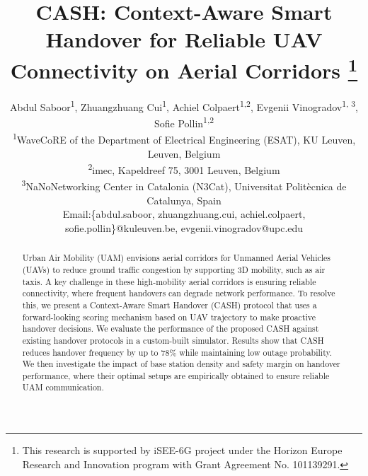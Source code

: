 \documentclass[10pt,conference]{IEEEtran}
\newcommand*\zc[1]{\textcolor{blue}{Zach: #1}}
\begin{document}
\title{ CASH: Context-Aware Smart Handover for Reliable UAV Connectivity on Aerial Corridors
\thanks{This research is supported by iSEE-6G project under the Horizon Europe Research and Innovation program with Grant Agreement No. 101139291.
}
}

\author{Abdul Saboor\textsuperscript{1},
         Zhuangzhuang Cui\textsuperscript{1},
         Achiel Colpaert\textsuperscript{1,2},
        Evgenii Vinogradov\textsuperscript{1, 3},
        Sofie Pollin\textsuperscript{1,2}
\\\textsuperscript{1}WaveCoRE of the Department of Electrical Engineering (ESAT), KU Leuven, Leuven, Belgium
\\\textsuperscript{2}imec, Kapeldreef 75, 3001 Leuven, Belgium
\\\textsuperscript{3}NaNoNetworking Center in Catalonia (N3Cat), Universitat Polit\`{e}cnica de Catalunya, Spain
\\Email:\{abdul.saboor, zhuangzhuang.cui,  achiel.colpaert, sofie.pollin\}@kuleuven.be, evgenii.vinogradov@upc.edu}

\maketitle

\begin{abstract}
Urban Air Mobility (UAM) envisions aerial corridors for Unmanned Aerial Vehicles (UAVs) to reduce ground traffic congestion by supporting 3D mobility, such as air taxis. A key challenge in these high-mobility aerial corridors is ensuring reliable connectivity, where frequent handovers can degrade network performance. To resolve this, we present a Context-Aware Smart Handover (CASH) protocol that uses a forward-looking scoring mechanism based on UAV trajectory to make proactive handover decisions. We evaluate the performance of the proposed CASH against existing handover protocols in a custom-built simulator. Results show that CASH reduces handover frequency by up to 78\% while maintaining low outage probability. We then investigate the impact of base station density and safety margin on handover performance, where their optimal setups are empirically obtained to ensure reliable UAM communication.

\end{abstract}
\end{document}
